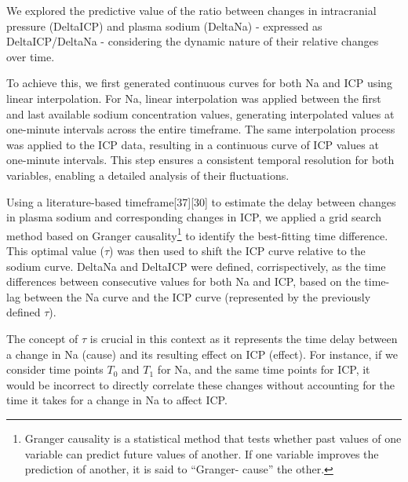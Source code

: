 We explored the predictive value of the ratio between changes in intracranial pressure (DeltaICP) and plasma sodium (DeltaNa) - expressed as DeltaICP/DeltaNa - considering the dynamic nature of their relative changes over time. 

To achieve this, we first generated continuous curves for both Na and ICP using linear interpolation. For Na, linear interpolation was applied between the first and last available sodium concentration values, generating interpolated values at one-minute intervals across the entire timeframe. The same interpolation process was applied to the ICP data, resulting in a continuous curve of ICP values at one-minute intervals. This step ensures a consistent temporal resolution for both variables, enabling a detailed analysis of their fluctuations.

Using a literature-based timeframe[37][30] to estimate the delay between changes in plasma sodium and corresponding changes in ICP, we applied a grid search method based on Granger causality\footnote{Granger causality is a statistical method that tests whether past values of one variable can predict future values of another. If one variable improves the prediction of another, it is said to “Granger- cause” the other.} to identify the best-fitting time difference. This optimal value ($\tau$) was then used to shift the ICP curve relative to the sodium curve. DeltaNa and DeltaICP were defined, corrispectively, as the time differences between consecutive values for both Na and ICP, based on the time-lag between the Na curve and the ICP curve (represented by the previously defined $\tau$).

The concept of $\tau$ is crucial in this context as it represents the time delay between a change in Na (cause) and its resulting effect on ICP (effect). For instance, if we consider time points $T_0$ and $T_1$ for Na, and the same time points for ICP, it would be incorrect to directly correlate these changes without accounting for the time it takes for a change in Na to affect ICP. 



